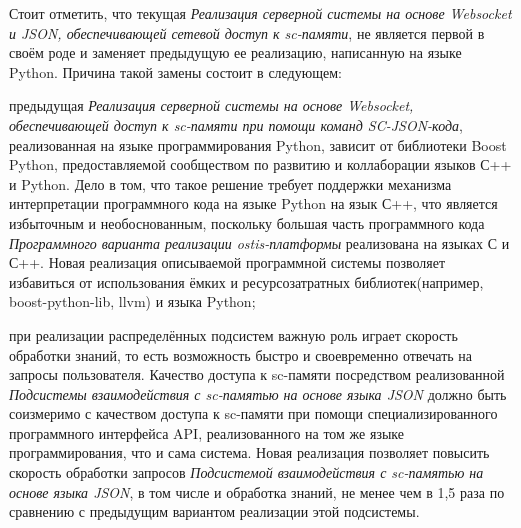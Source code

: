 Стоит отметить, что текущая \textit{Реализация серверной системы на основе Websocket и JSON, обеспечивающей сетевой доступ к sc-памяти}, не является первой в своём роде и заменяет предыдущую ее реализацию, написанную на языке Python. Причина такой замены состоит в следующем:
\begin{textitemize}
    \item предыдущая \textit{Реализация серверной системы на основе Websocket, обеспечивающей доступ к sc-памяти при помощи команд SC-JSON-кода}, реализованная на языке программирования Python, зависит от библиотеки Boost Python, предоставляемой сообществом по развитию и коллаборации языков С++ и Python. Дело в том, что такое решение требует поддержки механизма интерпретации программного кода на языке Python на язык С++, что является избыточным и необоснованным, поскольку большая часть программного кода \textit{Программного варианта реализации ostis-платформы} реализована на языках С и С++. Новая реализация описываемой программной системы позволяет избавиться от использования ёмких и ресурсозатратных библиотек(например, boost-python-lib, llvm) и языка Python;
    \item при реализации распределённых подсистем важную роль играет скорость обработки знаний, то есть возможность быстро и своевременно отвечать на запросы пользователя. Качество доступа к sc-памяти посредством реализованной \textit{Подсистемы взаимодействия с sc-памятью на основе языка JSON} должно быть соизмеримо с качеством доступа к sc-памяти при помощи специализированного программного интерфейса API, реализованного на том же языке программирования, что и сама система. Новая реализация позволяет повысить скорость обработки запросов \textit{Подсистемой взаимодействия с sc-памятью на основе языка JSON}, в том числе и обработка знаний, не менее чем в 1,5 раза по сравнению с предыдущим вариантом реализации этой подсистемы.
\end{textitemize}

